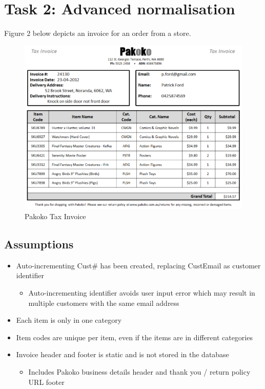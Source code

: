\newpage
\section{Task 2: Advanced normalisation}

Figure 2 below depicts an invoice for an order from a store.

\begin{figure}[H]
\centering
\caption{Pakoko Tax Invoice}
\includegraphics[scale=1]{./img/task2.pdf}
\end{figure}

\subsection*{Assumptions}

\begin{itemize}
\item Auto-incrementing Cust\# has been created, replacing CustEmail as customer identifier
	\begin{itemize}
	\item Auto-incrementing identifier avoids user input error which may result in multiple customers with the same email address
	\end{itemize}
\item Each item is only in one category
\item Item codes are unique per item, even if the items are in different categories
\item Invoice header and footer is static and is not stored in the database
	\begin{itemize}
	\item Includes Pakoko business details header and thank you / return policy URL footer
	\end{itemize}
\end{itemize}

